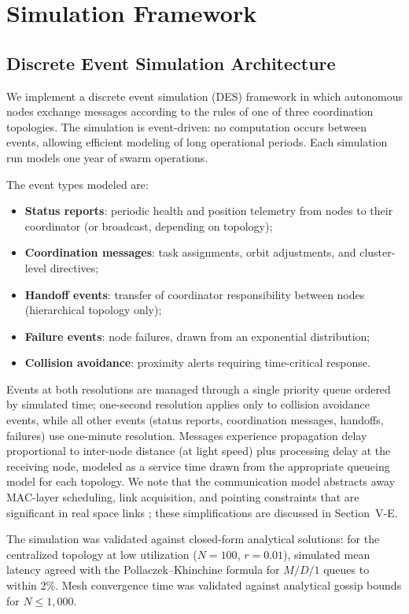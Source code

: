 \documentclass[journal]{IEEEtran}
\begin{document}
\section{Simulation Framework}

\subsection{Discrete Event Simulation Architecture}

We implement a discrete event simulation (DES) framework in which autonomous nodes exchange messages according to the rules of one of three coordination topologies. The simulation is event-driven: no computation occurs between events, allowing efficient modeling of long operational periods. Each simulation run models one year of swarm operations.

The event types modeled are:
\begin{itemize}
    \item \textbf{Status reports}: periodic health and position telemetry from nodes to their coordinator (or broadcast, depending on topology);
    \item \textbf{Coordination messages}: task assignments, orbit adjustments, and cluster-level directives;
    \item \textbf{Handoff events}: transfer of coordinator responsibility between nodes (hierarchical topology only);
    \item \textbf{Failure events}: node failures, drawn from an exponential distribution;
    \item \textbf{Collision avoidance}: proximity alerts requiring time-critical response.
\end{itemize}

Events at both resolutions are managed through a single priority queue ordered by simulated time; one-second resolution applies only to collision avoidance events, while all other events (status reports, coordination messages, handoffs, failures) use one-minute resolution. Messages experience propagation delay proportional to inter-node distance (at light speed) plus processing delay at the receiving node, modeled as a service time drawn from the appropriate queueing model for each topology. We note that the communication model abstracts away MAC-layer scheduling, link acquisition, and pointing constraints that are significant in real space links \cite{ccsds_prox1}; these simplifications are discussed in Section~V-E.

The simulation was validated against closed-form analytical solutions: for the centralized topology at low utilization ($N = 100$, $r = 0.01$), simulated mean latency agreed with the Pollaczek--Khinchine formula for $M/D/1$ queues to within 2\%. Mesh convergence time was validated against analytical gossip bounds \cite{demers_gossip} for $N \leq 1{,}000$.
\end{document}
